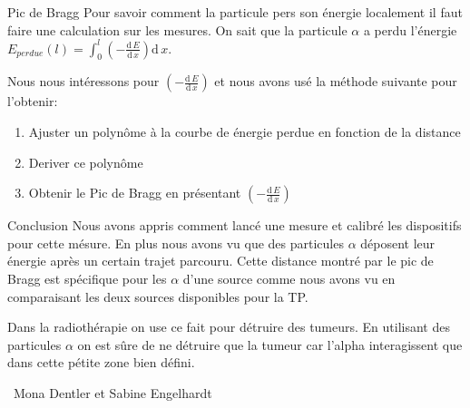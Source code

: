 \documentclass[a4paper,11pt]{scrartcl}
\begin{document}
 \begin{section}{Pic de Bragg}
  Pour savoir comment la particule pers son énergie localement il faut faire une calculation sur les mesures. On sait que la particule $\alpha$ a perdu l'énergie $E_{perdue}(l)=\int_0^l \left(-\frac{\text{d}\,E}{\text{d}\,x}\right) \text{d}\,x$.

  Nous nous intéressons pour $\left(-\frac{\text{d}\,E}{\text{d}\,x}\right)$ et nous avons usé la méthode suivante pour l'obtenir:
  \begin{enumerate}
   \item Ajuster un polynôme à la courbe de énergie perdue en fonction de la distance
   \item Deriver ce polynôme
   \item Obtenir le Pic de Bragg en présentant $\left(-\frac{\text{d}\,E}{\text{d}\,x}\right)$ 
  \end{enumerate}

 \end{section}

 
 \begin{section}{Conclusion}
  Nous avons appris comment lancé une mesure et calibré les dispositifs pour cette mésure. En plus nous avons vu que des particules $\alpha$ déposent leur énergie après un certain trajet parcouru. Cette distance montré par le pic de Bragg est spécifique pour les $\alpha$ d'une source comme nous avons vu en comparaisant les deux sources disponibles pour la TP.
  
  Dans la radiothérapie on use ce fait pour détruire des tumeurs. En utilisant des particules $\alpha$ on est sûre de ne détruire que la tumeur car l'alpha interagissent que dans cette pétite zone bien défini.
 \end{section}

 \vspace{1cm}
 \begin{flushright}
  \titlefont \textcopyleft\ Mona Dentler et Sabine Engelhardt
 \end{flushright}
\end{document}
